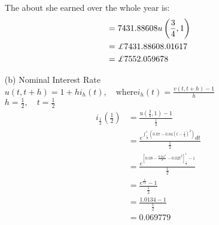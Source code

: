 \documentclass[12pt,a4paper]{article}
\begin{document}
\begin{enumerate}
The about she earned over the whole year is:\\
\begin{align*}
&= 7431.88608 u \left( \frac{3}{4} , 1   \right)\\
&=   \pounds  7431.88608 \time  1.01617 \\
&=  \pounds 7552.059678
\end{align*}
\item[(b)] Nominal Interest Rate\\
$u \left( t, t+h  \right) =  1 + h i_h(t) , \quad \text{where} i_h(t) =  \frac{ v\left( t, t+h  \right)  -1  }{ h}$\\
$h  =  \frac{1}{2},  \quad  t =  \frac{1}{2}$\\
\begin{align*}
i_{\frac{1}{2}}(\frac{1}{2}) &=  \frac{    u \left( \frac{3}{4}, 1  \right)  -1} {  \frac{1}{2}}\\
&=  \frac{  e^{ \int_{\frac{1}{2}}^1    \left(  0.07 -  0.04   \left(  t  -  \frac{ 1}{2} \right)^2   \right)  } dt   }{   \frac{1}{2} }\\
&=  \frac{ e^{  \left[   0.08 -  \frac{0.04t^3}{3}  -  0.02t^2  \right]^1_{\frac{1}{2}}   -1 }    }{   \frac{1}{2}}\\
&=  \frac{  e^{\frac{1}{75}} -1 }{   \frac{1}{2}}\\
&=  \frac{   1.0134  -1}{\frac{1}{2}}\\
&=  0.069779
\end{align*}
\end{enumerate}
\end{document}
